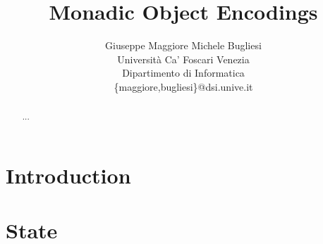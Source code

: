 \documentclass[a4paper]{article}
\begin{document}
\title{\bf Monadic Object Encodings}

\author{Giuseppe Maggiore \quad Michele Bugliesi
 \\ Universit\`a Ca' Foscari Venezia
 \\ Dipartimento di Informatica 
 \\ \{maggiore,bugliesi\}@dsi.unive.it
}

\date{}
\maketitle

\begin{abstract}
...
\end{abstract}

\section{Introduction}
\label{sec:intro}
 

\section{State}
\label{sec:mem}
 

 
 
 
 
 
 
 
\end{document}
